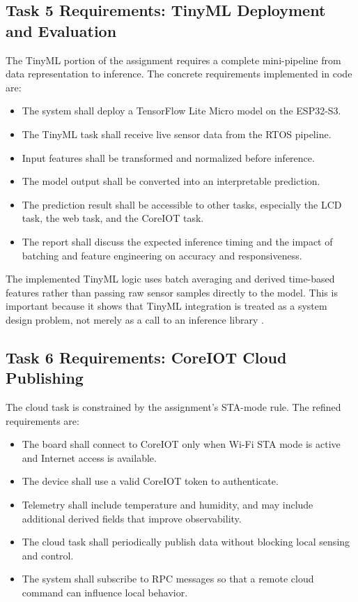\subsection{Task 5 Requirements: TinyML Deployment and Evaluation}
The TinyML portion of the assignment requires a complete mini-pipeline from
data representation to inference. The concrete requirements implemented in code
are:
\begin{itemize}
  \item The system shall deploy a TensorFlow Lite Micro model on the ESP32-S3.
  \item The TinyML task shall receive live sensor data from the RTOS pipeline.
  \item Input features shall be transformed and normalized before inference.
  \item The model output shall be converted into an interpretable prediction.
  \item The prediction result shall be accessible to other tasks, especially
  the LCD task, the web task, and the CoreIOT task.
  \item The report shall discuss the expected inference timing and the impact
  of batching and feature engineering on accuracy and responsiveness.
\end{itemize}

The implemented TinyML logic uses batch averaging and derived time-based
features rather than passing raw sensor samples directly to the model. This is
important because it shows that TinyML integration is treated as a system
design problem, not merely as a call to an inference library
\cite{tflm}.

\subsection{Task 6 Requirements: CoreIOT Cloud Publishing}
The cloud task is constrained by the assignment's STA-mode rule. The refined
requirements are:
\begin{itemize}
  \item The board shall connect to CoreIOT only when Wi-Fi STA mode is active
  and Internet access is available.
  \item The device shall use a valid CoreIOT token to authenticate.
  \item Telemetry shall include temperature and humidity, and may include
  additional derived fields that improve observability.
  \item The cloud task shall periodically publish data without blocking local
  sensing and control.
  \item The system shall subscribe to RPC messages so that a remote cloud
  command can influence local behavior.
\end{itemize}

